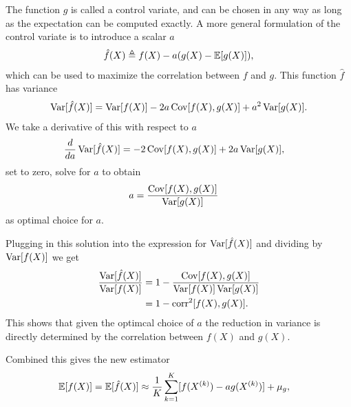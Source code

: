     The function $g$ is called a control variate, and can be chosen in any way as long as the expectation can be computed exactly. A more general formulation of the control variate is to introduce a scalar $a$
    \begin{align*}
        \hat{f}(X) \triangleq f(X) - a(g(X) - \operatorname{\mathbb{E}} [ g(X) ]),
    \end{align*}
    which can be used to maximize the correlation between $f$ and $g$. This function $\hat{f}$ has variance
    \begin{align*}
      \operatorname{Var} [ \hat{f}(X) ] = \operatorname{Var} [ f(X) ] - 2a  \operatorname{Cov} [ f(X), g(X) ] + a^2 \operatorname{Var} [ g(X) ].
    \end{align*}
    We take a derivative of this with respect to $a$
    \begin{align*}
        \frac{d}{d a}\operatorname{Var} [ \hat{f}(X) ] &= - 2  \operatorname{Cov} [ f(X), g(X) ] + 2a \operatorname{Var} [ g(X) ],
    \end{align*}
    set to zero, solve for $a$ to obtain
    \begin{align}
    \label{eq:cv-scale}
      a &= \frac{ \operatorname{Cov} [ f(X), g(X) ]}{ \operatorname{Var} [ g(X) ]}
    \end{align}
    as optimal choice for $a$.

    Plugging in this solution into the expression for $\operatorname{Var} [ \hat{f}(X) ]$ and dividing by $\operatorname{Var} [ f(X) ]$ we get
    \begin{align}
    \label{eq:var-red}
      \frac{\operatorname{Var} [ \hat{f}(X) ]}{\operatorname{Var} [ f(X) ]}
        &= 1 - \frac{\operatorname{Cov}[ f(X), g(X) ]}{ \operatorname{Var} [ f(X) ]  \operatorname{Var} [ g(X) ]} \\
        &= 1 - \operatorname{corr}^2 [ f(X), g(X) ].
    \end{align}
    This shows that given the optimcal choice of $a$ the reduction in variance is directly determined by the correlation between $f(X)$ and $g(X)$.

    Combined this gives the new estimator
    \begin{align*}
      \operatorname{\mathbb{E}} [ f(X) ]
        &= \operatorname{\mathbb{E}} [ \hat{f}(X) ] \approx \frac{1}{K} \sum_{k=1}^K [ f(X^{(k)}) - ag(X^{(k)}) ] + \mu_{g},
    \end{align*}

